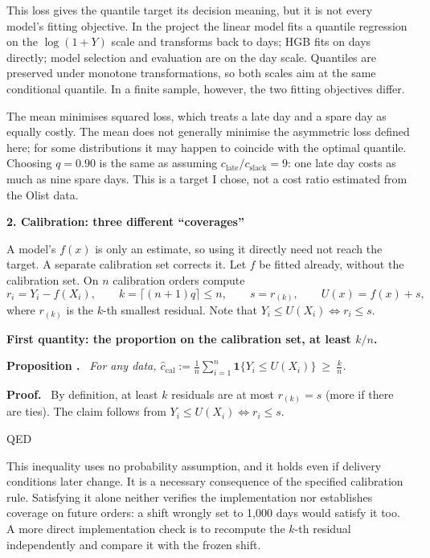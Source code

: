 \documentclass[11pt]{article}
\newcommand{\cl}{c_{\text{late}}}
\newcommand{\cs}{c_{\text{slack}}}
\newcommand{\1}{\mathbf 1}
\newcounter{prop}
\newenvironment{prop}{\refstepcounter{prop}\par\medskip\noindent\textbf{Proposition \theprop.}\ \itshape}{\par\medskip}
\newenvironment{pf}{\par\noindent\textbf{Proof.}\ }{\par\noindent\hfill QED\par\medskip}
\begin{document}
This loss gives the quantile target its decision meaning, but it is not every model's fitting objective. In the project the linear model fits a quantile regression on the \(\log(1+Y)\) scale and transforms back to days; HGB fits on days directly; model selection and evaluation are on the day scale. Quantiles are preserved under monotone transformations, so both scales aim at the same conditional quantile. In a finite sample, however, the two fitting objectives differ.

The mean minimises squared loss, which treats a late day and a spare day as equally costly. The mean does not generally minimise the asymmetric loss defined here; for some distributions it may happen to coincide with the optimal quantile. Choosing \(q=0.90\) is the same as assuming \(\cl/\cs=9\): one late day costs as much as nine spare days. This is a target I chose, not a cost ratio estimated from the Olist data.

\bigskip
\textbf{2. Calibration: three different ``coverages''}

A model's \(f(x)\) is only an estimate, so using it directly need not reach the target. A separate calibration set corrects it. Let \(f\) be fitted already, without the calibration set. On \(n\) calibration orders compute
\[
r_i=Y_i-f(X_i),\qquad k=\lceil (n+1)q\rceil\le n,\qquad s=r_{(k)},\qquad U(x)=f(x)+s ,
\]
where \(r_{(k)}\) is the \(k\)-th smallest residual. Note that \(Y_i\le U(X_i)\iff r_i\le s\).

\textbf{First quantity: the proportion on the calibration set, at least \(k/n\).}

\begin{prop}
For any data, \(\displaystyle \hat c_{\mathrm{cal}}:=\frac1n\sum_{i=1}^n \1\{Y_i\le U(X_i)\}\ \ge\ \frac kn\).
\end{prop}

\begin{pf}
By definition, at least \(k\) residuals are at most \(r_{(k)}=s\) (more if there are ties). The claim follows from \(Y_i\le U(X_i)\iff r_i\le s\).
\end{pf}

This inequality uses no probability assumption, and it holds even if delivery conditions later change. It is a necessary consequence of the specified calibration rule. Satisfying it alone neither verifies the implementation nor establishes coverage on future orders: a shift wrongly set to 1,000 days would satisfy it too. A more direct implementation check is to recompute the \(k\)-th residual independently and compare it with the frozen shift.
\end{document}
